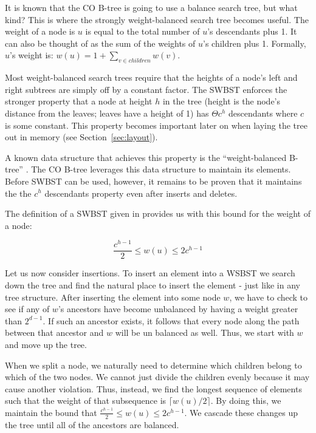 \documentclass{style}
\begin{document}
It is known that the CO B-tree is going to use a balance search tree, but what
kind? This is where the strongly weight-balanced search tree becomes useful.
The weight of a node is $u$ is equal to the total number of $u$'s descendants
plus 1. It can also be thought of as the sum of the weights of $u$'s children
plus 1. Formally, $u$'s weight is: $w(u) = 1 + \sum_{v \in children} w(v)$.

Most weight-balanced search trees require that the heights of a node's left
and right subtrees are simply off by a constant factor. The SWBST enforces the
stronger property that a node at height $h$ in the tree (height is the node's
distance from the leaves; leaves have a height of 1) has $\Theta c^h$
descendants where $c$ is some constant. This property becomes important later
on when laying the tree out in memory (see Section~\ref{sec:layout}).

A known data structure that achieves this property is the ``weight-balanced
B-tree'' \cite{swbst}. The CO B-tree leverages this data structure to maintain
its elements. Before SWBST can be used, however, it remains to be proven that
it maintains the the $c^h$ descendants property even after inserts and
deletes.

The definition of a SWBST given in \cite{swbst} provides us with this bound
for the weight of a node:

\begin{equation}
\frac{c^{h-1}}{2} \leq w(u) \leq 2c^{h-1}
\end{equation}

Let us now consider insertions. To insert an element into a WSBST we search
down the tree and find the natural place to insert the element - just like in
any tree structure. After inserting the element into some node $w$, we have to
check to see if any of $w$'s ancestors have become unbalanced by having a
weight greater than $2^{d-1}$. If such an ancestor exists, it follows that
every node along the path between that ancestor and $w$ will be un balanced as
well. Thus, we start with $w$ and move up the tree.

When we split a node, we naturally need to determine which children belong to
which of the two nodes. We cannot just divide the children evenly because it
may cause another violation. Thus, instead, we find the longest sequence of
elements such that the weight of that subsequence is $\lceil w(u)/2 \rceil$.
By doing this, we maintain the bound that $\frac{c^{h-1}}{2} \leq w(u) \leq
2c^{h-1}$. We cascade these changes up the tree until all of the ancestors are
balanced.
\end{document}
